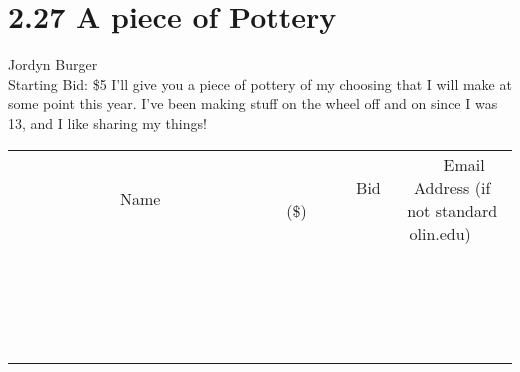 \documentclass[11pt]{article}
\begin{document}
\section*{2.27 A piece of Pottery}
Jordyn Burger
\\
Starting Bid: \$5
\newline
I'll give you a piece of pottery of my choosing that I will make at some point this year. I've been making stuff on the wheel off and on since I was 13, and I like sharing my things!
\\[3ex]
\begin{tabular}{c c c}
~~~~~~~~~~~~~Name~~~~~~~~~~~~~ & ~~~~~~~~~Bid (\$)~~~~~~~~~  & ~~~Email Address (if not standard olin.edu)~~~\\
 & & \\
\hline
 & & \\
\hline
 & & \\
\hline
 & & \\
\hline
 & & \\
\hline
 & & \\
\hline
 & & \\
\hline
 & & \\
\hline
 & & \\
\hline
 & & \\
\hline
 & & \\
\hline
 & & \\
\hline
 & & \\
\hline
 & & \\
\hline
 & & \\
\hline
 & & \\
\hline
 & & \\
\hline
 & & \\
\hline
 & & \\
\hline
\end{tabular}
\newpage
\end{document}
